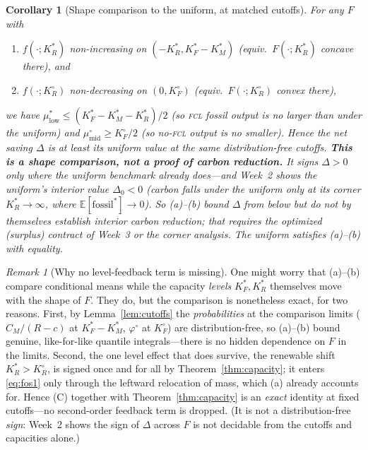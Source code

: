 \documentclass[11pt,reqno]{amsart}
\theoremstyle{plain}
\newtheorem{corollary}{Corollary}
\theoremstyle{definition}
\theoremstyle{remark}
\newtheorem{remark}{Remark}
\newcommand{\KRs}{K_R^{*}}
\newcommand{\KFs}{K_F^{*}}
\newcommand{\KMs}{K_M^{*}}
\newcommand{\KRo}{K_R^{\circ}}
\newcommand{\KFo}{K_F^{\circ}}
\newcommand{\CM}{C_M}
\newcommand{\E}{\mathbb{E}}
\begin{document}
\begin{corollary}[Shape comparison to the uniform, at matched cutoffs]\label{cor:suff}
For any $F$ with
\begin{enumerate}[label=(\alph*),leftmargin=2.4em]
  \item $f(\cdot;\KRs)$ non-increasing on $(-\KRs,\KFs-\KMs)$ \;(equiv.\ $F(\cdot;\KRs)$ concave there), and
  \item $f(\cdot;\KRo)$ non-decreasing on $(0,\KFo)$ \;(equiv.\ $F(\cdot;\KRo)$ convex there),
\end{enumerate}
we have $\mu^{*}_{\mathrm{low}}\le(\KFs-\KMs-\KRs)/2$ (so \textsc{fcl} fossil output is no
larger than under the uniform) and $\mu^{\circ}_{\mathrm{mid}}\ge\KFo/2$ (so no-\textsc{fcl}
output is no smaller). Hence the net saving $\Delta$ is \emph{at least} its uniform value at
the same distribution-free cutoffs. \textbf{This is a shape comparison, not a proof of
carbon reduction.} It signs $\Delta>0$ only where the uniform benchmark already does---and
Week~2 shows the uniform's \emph{interior} value $\Delta_0<0$ (carbon falls under the
uniform only at its corner $\KRs\to\infty$, where $\E[\text{fossil}^{*}]\to0$). So (a)--(b)
bound $\Delta$ from below but do \emph{not} by themselves establish interior carbon
reduction; that requires the optimized (surplus) contract of Week~3 or the corner analysis.
The uniform satisfies (a)--(b) with equality.
\end{corollary}

\begin{remark}[Why no level-feedback term is missing]\label{rem:feedback}
One might worry that (a)--(b) compare conditional means while the capacity
\emph{levels} $\KFs,\KRs$ themselves move with the shape of $F$. They do, but the
comparison is nonetheless exact, for two reasons. First, by
Lemma~\ref{lem:cutoffs} the \emph{probabilities} at the comparison limits
($\CM/(R-c)$ at $\KFs-\KMs$, $\varphi^{\circ}$ at $\KFo$) are distribution-free,
so (a)--(b) bound genuine, like-for-like quantile integrals---there is no hidden
dependence on $F$ in the limits. Second, the one level effect that does survive,
the renewable shift $\KRs>\KRo$, is signed once and for all by
Theorem~\ref{thm:capacity}; it enters \eqref{eq:fos1} only through the leftward
relocation of mass, which (a) already accounts for. Hence (C) together with
Theorem~\ref{thm:capacity} is an \emph{exact} identity at fixed cutoffs---no
second-order feedback term is dropped. (It is not a distribution-free \emph{sign}: Week~2
shows the sign of $\Delta$ across $F$ is not decidable from the cutoffs and capacities
alone.)
\end{remark}
\end{document}
